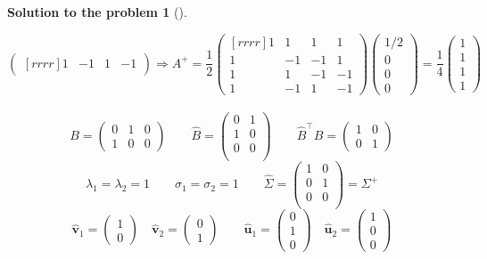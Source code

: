 \documentclass[12pt,a4]{article}
\newtheorem{solution}{Solution to the problem}
\newcommand{\bu}{{\mathbf u}}
\newcommand{\bv}{{\mathbf v}}
\begin{document}
\begin{solution}[]
\begin{enumerate}[(a)]
\[\begin{pmatrix}[rrrr]
1 & -1 & 1 & -1
\end{pmatrix}
\Rightarrow
A^+ =\frac12
\begin{pmatrix}[rrrr]
1 & 1 & 1 & 1\\
1 & -1 & -1 & 1\\
1 & 1 & -1 & -1\\
1 & -1 & 1 & -1
\end{pmatrix}
\begin{pmatrix} 1/2 \\ 0 \\ 0 \\ 0 \end{pmatrix}
= \frac14
\begin{pmatrix} 1 \\ 1 \\ 1 \\ 1 \end{pmatrix}
\]\\[10pt]
\[
B = \begin{pmatrix}
0 & 1 & 0 \\
1 & 0 & 0
\end{pmatrix}
\qquad
\hat B = \begin{pmatrix}
0 & 1 \\
1 & 0 \\
0 & 0 \\
\end{pmatrix}
\qquad
\hat B^\top \hat B = \begin{pmatrix}
1 & 0\\
0 & 1 
\end{pmatrix}
\]
\[
\lambda_1=\lambda_2=1
\qquad
\sigma_1=\sigma_2=1
\qquad
\hat\Sigma = \begin{pmatrix}
1 & 0 \\
0 & 1 \\
0 & 0 \\
\end{pmatrix}
= \Sigma^+
\]
\[
\hat \bv_1 = \begin{pmatrix} 1 \\ 0 \end{pmatrix}
\quad
\hat \bv_2 = \begin{pmatrix} 0 \\ 1 \end{pmatrix}
\qquad
\hat \bu_1 = \begin{pmatrix} 0 \\ 1 \\ 0 \end{pmatrix}
\quad
\hat \bu_2 = \begin{pmatrix} 1 \\ 0 \\ 0 \end{pmatrix}
\]
\end{enumerate}
\end{solution}
\end{document}
